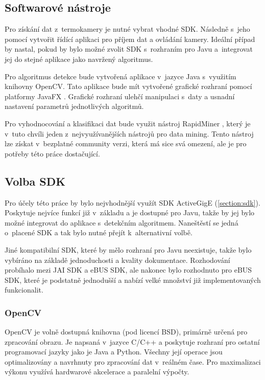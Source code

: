 	\subsection{Softwarové nástroje}
    Pro získání dat z~termokamery je nutné vybrat vhodné SDK. Následně s~jeho pomocí vytvořit řídící aplikaci pro příjem dat a ovládání kamery. Ideální případ by nastal, pokud by bylo možné zvolit SDK s~rozhraním pro Javu a~integrovat jej do stejné aplikace jako navržený algoritmus.
    
    Pro algoritmus detekce bude vytvořená aplikace v~jazyce Java s~využitím knihovny OpenCV. Tato aplikace bude mít vytvořené grafické rozhraní pomocí platformy JavaFX \cite{javafx}. Grafické rozhraní ulehčí manipulaci s~daty a usnadní nastavení parametrů jednotlivých algoritmů.

Pro vyhodnocování a klasifikaci dat bude využit nástroj RapidMiner \cite{rapidminer}, který je v~tuto chvíli jeden z~nejvyužívanějších nástrojů pro data mining. Tento nástroj lze získat v~bezplatné community verzi, která má sice svá omezení, ale je pro potřeby této práce dostačující.
    
    \subsection{Volba SDK}
    Pro účely této práce by bylo nejvhodnější využít SDK ActiveGigE (\ref{section:sdk}). Poskytuje nejvíce funkcí již v~základu a je dostupné pro Javu, takže by jej bylo možné integrovat do aplikace s~detekčním algoritmem. Naneštěstí se jedná o~placené SDK a tak bylo nutné přejít k~alternativní volbě. 
    
    Jiné kompatibilní SDK, které by mělo rozhraní pro Javu neexistuje, takže bylo vybíráno na základě jednoduchosti a kvality dokumentace. Rozhodování probíhalo mezi JAI SDK a eBUS SDK, ale nakonec bylo rozhodnuto pro eBUS SDK, které je podstatně jednodušší a nabízí velké množství již implementovaných funkcionalit.
    
    \subsubsection{OpenCV}
    OpenCV \cite{opencv_library} je volně dostupná knihovna (pod licencí BSD), primárně určená pro zpracování obrazu. Je napsaná v~jazyce C/C++ a poskytuje rozhraní pro ostatní programovací jazyky jako je Java a Python. Všechny její operace jsou optimalizovány a navrhnuty pro zpracování dat v~reálném čase. Pro maximalizaci výkonu využívá hardwarové akcelerace a paralelní výpočty.